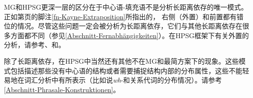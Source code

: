 MG和HPSG更深一层的区分在于中心语-填充语不是分析长距离依存的唯一模式。正如第\pageref{fn-Kayne-Extraposition}页的脚注\ref{fn-Kayne-Extraposition}所指出的， 右侧（外置）和前置都有错位的情况。尽管这些问题一定会被分析为长距离依存，它们与其他长距离依存在很多方面都不同（参见\ref{Abschnitt-Fernabhängigkeiten}）。在HPSG框架下有关外置的分析，请参考、和。

除了长距离依存，在HPSG中当然还有其他不在MG和最简方案下的现象。这些模式包括描述那些没有中心语的结构或者需要捕捉结构内部的分布属性，这些不能轻易地在词汇分析中有所表示（比如说\emph{wh}-和关系代词的分布情况）。请参考\ref{Abschnitt-Phrasale-Konstruktionen}。

